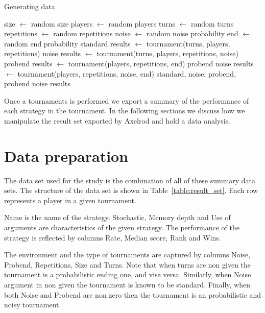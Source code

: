 \documentclass{article}
\begin{document}
\begin{algorithm}
    \caption{Generating data}
    \label{alg:tournaments}
      \begin{algorithmic}[1]
                \STATE size $\gets$ random  size
                \STATE players $\gets$ random players
             \ELSE
                 \STATE turns $\gets$ random turns
                 \STATE repetitions  $\gets$  random  repetitions
                 \STATE noise  $\gets$ random  noise  probability
                 \STATE end  $\gets$  random end probability
                 \STATE standard results $\gets$ tournament(turns, players, repetitions) 
                 \STATE noise results $\gets$ tournament(turns, players, repetitions, noise)
                 \STATE probend results $\gets$ tournament(players, repetitions, end)
                 \STATE probend noise results $\gets$ tournament(players, repetitions, noise, end)
             \ENDIF
             \RETURN standard, noise, probend, probend noise results
        \ENDFOR
      \end{algorithmic}
\end{algorithm}

Once a tournaments is performed we export a summary of the performance
of each strategy in the tournament. In the following sections we discuss how we
manipulate the result set exported by Axelrod and hold a data analysis.

\section{Data preparation}

The data set used for the study is the combination of all of these summary data sets.
The structure of the data set is shown in Table~\ref{table:result_set}. Each row
represents a player in a given tournament.

Name is the name of the strategy. Stochastic, Memory depth and Use of arguments are
characteristics of the given strategy. The performance of the strategy is reflected
by columns Rate, Median score, Rank and Wins.

The environment and the type of tournaments are captured by columns Noise, Probend,
Repetitions, Size and Turns. Note that when turns are non given the tournament is a
probabilistic ending one, and vise versa. Similarly, when Noise argument in non given
the tournament is known to be standard. Finally, when both Noise and Probend are
non zero then the tournament is an probabilistic and noisy tournament
\end{document}
